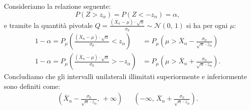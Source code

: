             \begin{prty}[Intervallo unilaterale con $\mu =\,?,\, \sigma^2 = \sigma^2_0$]
                Consideriamo la relazione seguente: \[
                    P(Z > z_\alpha) = P(Z < -z_\alpha) = \alpha
                ,\] e tramite la quantità pivotale $Q = \frac{(\overline{X}_n -\mu)\cdot \sqrt{n}}{\sigma_0} \sim \mathcal{N}(0,\,1)$ si ha per ogni $\mu$:
                \begin{align*}
                    1-\alpha = P_{\mu}\left(\frac{(\overline{X}_n -\mu)\cdot \sqrt{n}}{\sigma_0} 
                    < z_\alpha\right) &= P_\mu\left(\mu > \overline{X}_n 
                    -\frac{\sigma_0}{\sqrt{n}\cdot z_\alpha}\right) \\
                    1-\alpha = P_{\mu}\left(\frac{(\overline{X}_n -\mu)\cdot \sqrt{n}}{\sigma_0} 
                    > -z_\alpha\right) &= P_\mu\left(\mu > \overline{X}_n 
                    +\frac{\sigma_0}{\sqrt{n}\cdot z_\alpha}\right)
                .\end{align*}
                Concludiamo che gli intervalli unilaterali illimitati superiormente e inferiormente sono 
                definiti come:
                \begin{align*}
                    \left(\overline{X}_n -\frac{\sigma_0}{\sqrt{n}\cdot z_\alpha},\, +\infty\right) & &
                    \left(-\infty,\, \overline{X}_n +\frac{\sigma_0}{\sqrt{n}\cdot z_\alpha}\right)
                .\end{align*}
            \end{prty}
